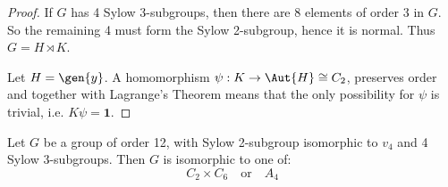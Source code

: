 \begin{proof}
    If \(G\) has 4 Sylow 3-subgroups, then there are 8 elements of order 3 in \(G\).
    So the remaining 4 must form the Sylow 2-subgroup, hence it is normal.
    Thus \(G = H \rtimes K\).

    Let \(H = \gen{y}\).
    A homomorphism \(\psi:K \to \Aut{H} \cong C_2\), preserves order and together with Lagrange's Theorem means that
    the only possibility for \(\psi\) is trivial, i.e. \(K\psi = \bm{1}\).
\end{proof}

\begin{lemma}
    Let \(G\) be a group of order 12, with Sylow 2-subgroup isomorphic to \(v_4\) and 4 Sylow 3-subgroups.
    Then \(G\) is isomorphic to one of:
    \[
        C_{2} \times C_6 \quad \text{or} \quad%
        A_{4}
    \]
\end{lemma}

